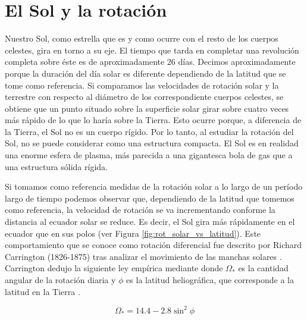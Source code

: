 \section{El Sol y la rotación}
Nuestro Sol, como estrella que es y como ocurre con el resto de los cuerpos celestes, gira en torno a su eje. El tiempo que tarda en completar una revolución completa sobre éste es de aproximadamente 26 días. Decimos aproximadamente porque la duración del día solar es diferente dependiendo de la latitud que se tome como referencia. Si comparamos las velocidades de rotación solar y la terrestre con respecto al diámetro de los correspondiente cuerpos celestes, se obtiene que un punto situado sobre la superficie solar girar sobre cuatro veces más rápido de lo que lo haría sobre la Tierra. Esto ocurre porque, a diferencia de la Tierra, el Sol no es un cuerpo rígido. Por lo tanto, al estudiar la rotación del Sol, no se puede considerar como una estructura compacta. El Sol es en realidad una enorme esfera de plasma, más parecida a una gigantesca bola de gas que a una estructura sólida rígida.\par

Si tomamos como referencia medidas de la rotación solar a lo largo de un período largo de tiempo podemos observar que, dependiendo de la latitud que tomemos como referencia, la velocidad de rotación se va incrementando conforme la distancia al ecuador solar se reduce. Es decir, el Sol gira más rápidamente en el ecuador que en sus polos (ver Figura \ref{fig:rot_solar_vs_latitud}). Este comportamiento que se conoce como rotación diferencial fue descrito por Richard Carrington (1826-1875) tras analizar el movimiento de las manchas solares \citep{Carrington1863}. Carrington dedujo la siguiente ley empírica mediante donde $\Omega_*$ es la cantidad angular de la rotación diaria y $\phi$ es la latitud heliográfica, que corresponde a la latitud en la Tierra  \citep{Banisch2009}.\par

\begin{ceqn}
\begin{equation}
    \Omega_* = 14.4 - 2.8\sin^2\phi \label{eq:ang_rot_sun}
\end{equation}
\end{ceqn}

